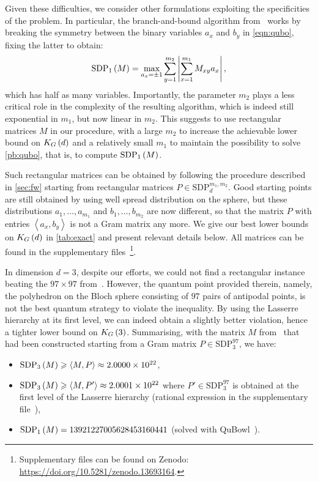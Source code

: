 \documentclass[10pt,aps,notitlepage,onecolumn,pra,superscriptaddress]{revtex4-1}
\renewcommand{\geq}{\geqslant}
\newcommand\cut[2]{\mathrm{SDP}_{#1}^{#2}}
\newcommand{\innp}[2]{\left\langle{#1},{#2}\right\rangle}
\newcommand\KG[2]{K_G\left({#1}\ifx#2\empty\else\mapsto\fi{#2}\right)}
\newcommand\sdp[2]{\mathrm{SDP}_{#1}\ifx#2\empty\else\left({#2}\right)\fi}
\begin{document}
Given these difficulties, we consider other formulations exploiting the specificities of the problem.
In particular, the branch-and-bound algorithm from~\cite{DBV17} works by breaking the symmetry between the binary variables $a_x$ and $b_y$ in \cref{eqn:qubo}, fixing the latter to obtain:
\begin{equation}
  \sdp{1}{M}=\max_{a_x=\pm1}\sum_{y=1}^{m_2}\left|\sum_{x=1}^{m_1} M_{xy}{a_x}\right|,
  \label{eqn:bnb}
\end{equation}
which has half as many variables.
Importantly, the parameter $m_2$ plays a less critical role in the complexity of the resulting algorithm, which is indeed still exponential in $m_1$, but now linear in $m_2$.
This suggests to use rectangular matrices $M$ in our procedure, with a large $m_2$ to increase the achievable lower bound on $\KG{d}{}$ and a relatively small $m_1$ to maintain the possibility to solve \cref{pb:qubo}, that is, to compute $\sdp{1}{M}$.

Such rectangular matrices can be obtained by following the procedure described in \cref{sec:fw} starting from rectangular matrices $P\in\cut{d}{m_1,m_2}$.
Good starting points are still obtained by using well spread distribution on the sphere, but these distributions $a_1,\ldots,a_{m_1}$ and $b_1,\ldots,b_{m_2}$ are now different, so that the matrix $P$ with entries $\innp{a_x}{b_y}$ is not a Gram matrix any more.
We give our best lower bounds on $\KG{d}{}$ in \cref{tab:exact} and present relevant details below.
All matrices can be found in the supplementary files~\footnote{Supplementary files can be found on Zenodo: \url{https://doi.org/10.5281/zenodo.13693164}.}.

In dimension $d=3$, despite our efforts, we could not find a rectangular instance beating the $97\times97$ from~\cite{DIB+23}.
However, the quantum point provided therein, namely, the polyhedron on the Bloch sphere consisting of $97$ pairs of antipodal points, is not the best quantum strategy to violate the inequality.
By using the Lasserre hierarchy at its first level, we can indeed obtain a slightly better violation, hence a tighter lower bound on $\KG{3}{}$.
Summarising, with the matrix $M$ from~\cite{DIB+23} that had been constructed starting from a Gram matrix $P\in\cut{3}{97}$, we have:
\begin{itemize}
  \item $\sdp{3}{M}\geq\innp{M}{P}\approx2.0000\times10^{22}$,
  \item $\sdp{3}{M}\geq\innp{M}{P'}\approx2.0001\times10^{22}$ where $P'\in\cut{3}{97}$ is obtained at the first level of the Lasserre hierarchy (rational expression in the supplementary file~\cite{Note1}),
  \item $\sdp{1}{M}=13921227005628453160441$ (solved with QuBowl~\cite{RKS23}).
\end{itemize}
\end{document}
